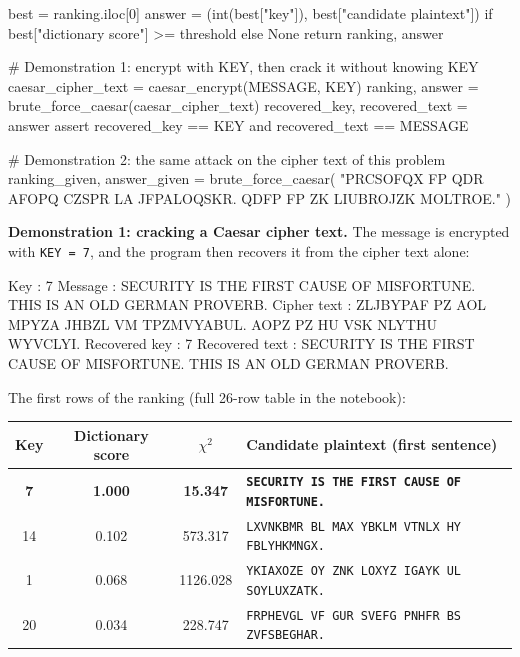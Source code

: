 \documentclass[a4paper, 10pt]{article}
\begin{document}
\begin{problem}
\begin{subproblems_alpha}
\begin{solution}
\begin{codingbox*}[language=Python, belowskip=6pt]
    best = ranking.iloc[0]
    answer = (int(best["key"]), best["candidate plaintext"]) if best["dictionary score"] >= threshold else None
    return ranking, answer

# Demonstration 1: encrypt with KEY, then crack it without knowing KEY
caesar_cipher_text = caesar_encrypt(MESSAGE, KEY)
ranking, answer = brute_force_caesar(caesar_cipher_text)
recovered_key, recovered_text = answer
assert recovered_key == KEY and recovered_text == MESSAGE

# Demonstration 2: the same attack on the cipher text of this problem
ranking_given, answer_given = brute_force_caesar(
    "PRCSOFQX FP QDR AFOPQ CZSPR LA JFPALOQSKR. QDFP FP ZK LIUBROJZK MOLTROE."
)
\end{codingbox*}

		      \textbf{Demonstration 1: cracking a Caesar cipher text.}
		      The message is encrypted with \texttt{KEY = 7}, and the program then recovers it from the cipher text alone:
		      \begin{codingbox*}[numbers=none, xleftmargin=0pt, belowskip=6pt, basicstyle=\ttfamily\footnotesize\color{editortext}]
Key            : 7
Message        : SECURITY IS THE FIRST CAUSE OF MISFORTUNE. THIS IS AN OLD GERMAN PROVERB.
Cipher text    : ZLJBYPAF PZ AOL MPYZA JHBZL VM TPZMVYABUL. AOPZ PZ HU VSK NLYTHU WYVCLYI.
Recovered key  : 7
Recovered text : SECURITY IS THE FIRST CAUSE OF MISFORTUNE. THIS IS AN OLD GERMAN PROVERB.
\end{codingbox*}
		      The first rows of the ranking (full 26-row table in the notebook):
		      \begin{center}
			      \footnotesize
			      \begin{tabular}{cccl}
				      \toprule
				      Key        & Dictionary score & $\chi^2$        & Candidate plaintext (first sentence)                         \\
				      \midrule
				      \textbf{7} & \textbf{1.000}   & \textbf{15.347} & \texttt{\textbf{SECURITY IS THE FIRST CAUSE OF MISFORTUNE.}} \\
				      14         & 0.102            & 573.317         & \texttt{LXVNKBMR BL MAX YBKLM VTNLX HY FBLYHKMNGX.}          \\
				      1          & 0.068            & 1126.028        & \texttt{YKIAXOZE OY ZNK LOXYZ IGAYK UL SOYLUXZATK.}          \\
				      20         & 0.034            & 228.747         & \texttt{FRPHEVGL VF GUR SVEFG PNHFR BS ZVFSBEGHAR.}          \\

\end{tabular}
\end{center}
\end{solution}
\end{subproblems_alpha}
\end{problem}
\end{document}
